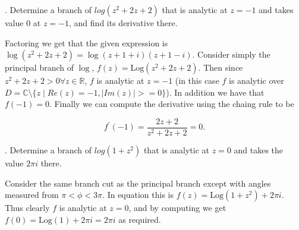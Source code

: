 \documentclass[letterpaper, reqno,11pt]{article}
\begin{document}
\medskip

. Determine a branch of $ log (z^2+2z+2)$ that is analytic at $z=-1$ and takes value $ 0$ at $z=-1$, and find its derivative there.

Factoring we get that the given expression is $ \log(z^2+2z+2)=\log(z+1+i)(z+1-i)$. Consider simply the principal branch of $\log$, $f(z)=\text{Log}(z^2+2z+2)$. Then since $z^2+2z+2>0\forall z\in\mathbb{R}$, $f$ is analytic at  $z=-1$ (in this case $f$ is analytic over $D=\mathbb{C}\setminus\{z\mid Re(z)=-1, |Im(z)|>=0\} $). In addition we have that $f(-1)=0$. Finally we can compute the derivative using the chaing rule to be

\[
f^\prime(-1)=\frac{2z+2}{z^2+2z+2}=0
.\]


\medskip

. Determine a branch of $log (1+z^2)$ that is analytic at $z=0$ and takes the value $2 \pi i$ there.

Consider the same branch cut as the principal branch except with angles measured from $\pi<\phi<3\pi$. In equation this is $f(z)=\text{Log}(1+z^2)+2\pi i$. Thus clearly $f$ is analytic at $z=0$, and by computing we get $f(0)=\text{Log}(1)+2\pi i=2\pi i$ as required. 
\end{document}
